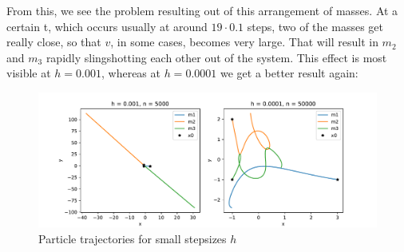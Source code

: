\documentclass{article}
\begin{document}
From this, we see the problem resulting out of this arrangement of masses.
At a certain t, which occurs usually at around \( 19 \cdot 0.1 \) steps, two
of the masses get really close, so that \( v \), in some cases, becomes very large. That
will result in \( m_2 \) and \( m_3 \) rapidly slingshotting each other out of
the system. This effect is most visible at \( h = 0.001 \), whereas at
\( h = 0.0001 \) we get a better result again:
\begin{figure}[ht]
    \centering
    \includegraphics[width=\textwidth]{fig2b_small.pdf} 
    \caption{Particle trajectories for small stepsizes $h$} 
\end{figure}
\end{document}

